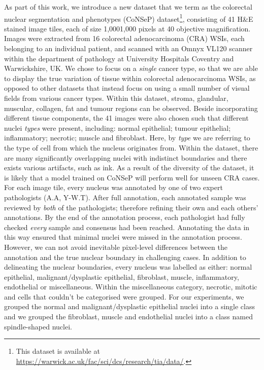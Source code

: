 \documentclass[journal]{IEEEtran}
\begin{document}
	As part of this work, we introduce a new dataset that we term as the colorectal nuclear segmentation and phenotypes (CoNSeP) dataset\footnote{This dataset is available at \url{https://warwick.ac.uk/fac/sci/dcs/research/tia/data/}.}, consisting of 41 H\&E stained image tiles, each of size 1,0001,000 pixels at 40 objective magnification. Images were extracted from 16 colorectal adenocarcinoma (CRA) WSIs, each belonging to an individual patient, and scanned with an Omnyx VL120 scanner within the department of pathology at University Hospitals Coventry and Warwickshire, UK. We chose to focus on a \textit{single} cancer type, so that we are able to display the true variation of tissue within colorectal adenocarcinoma WSIs, as opposed to other datasets that instead focus on using a small number of visual fields from various cancer types. Within this dataset, stroma, glandular, muscular, collagen, fat and tumour regions can be observed. Beside incorporating different tissue components, the 41 images were also chosen such that different nuclei \textit{types} were present, including: normal epithelial; tumour epithelial; inflammatory; necrotic; muscle and fibroblast. Here, by \textit{type} we are referring to the type of cell from which the nucleus originates from. Within the dataset, there are many significantly overlapping nuclei with indistinct boundaries and there exists various artifacts, such as ink. As a result of the diversity of the dataset, it is likely that a model trained on CoNSeP will perform well for unseen CRA cases. For each image tile, every nucleus was annotated by one of two expert pathologists (A.A, Y-W.T). After full annotation, each annotated sample was reviewed by \textit{both} of the pathologists; therefore refining their own and each others' annotations. By the end of the annotation process, each pathologist had fully checked \textit{every} sample and consensus had been reached. Annotating the data in this way ensured that minimal nuclei were missed in the annotation process. However, we can not avoid inevitable pixel-level differences between the annotation and the true nuclear boundary in challenging cases. In addition to delineating the nuclear boundaries, every nucleus was labelled as either: normal epithelial, malignant/dysplastic epithelial, fibroblast, muscle, inflammatory, endothelial or miscellaneous. Within the miscellaneous category, necrotic, mitotic and cells that couldn't be categorised were grouped. For our experiments, we grouped the normal and malignant/dysplastic epithelial nuclei into a single class and we grouped the fibroblast, muscle and endothelial nuclei into a class named spindle-shaped nuclei. 
	
\end{document}
